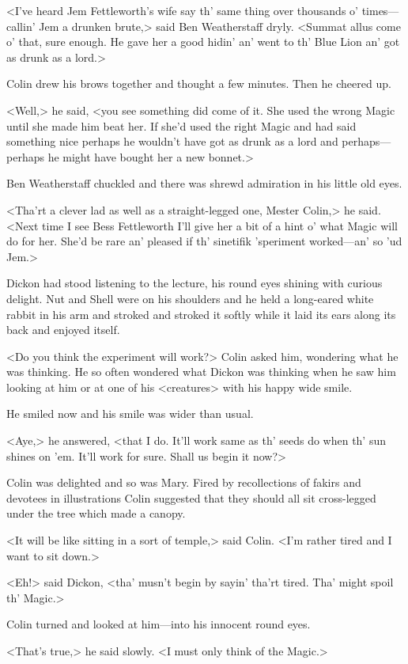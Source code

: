 <I've heard Jem Fettleworth's wife say th' same thing over thousands o' times—callin' Jem a drunken brute,> said Ben Weatherstaff dryly. <Summat allus come o' that, sure enough. He gave her a good hidin' an' went to th' Blue Lion an' got as drunk as a lord.>

Colin drew his brows together and thought a few minutes. Then he cheered up.

<Well,> he said, <you see something did come of it. She used the wrong Magic until she made him beat her. If she'd used the right Magic and had said something nice perhaps he wouldn't have got as drunk as a lord and perhaps—perhaps he might have bought her a new bonnet.>

Ben Weatherstaff chuckled and there was shrewd admiration in his little old eyes.

<Tha'rt a clever lad as well as a straight-legged one, Mester Colin,> he said. <Next time I see Bess Fettleworth I'll give her a bit of a hint o' what Magic will do for her. She'd be rare an' pleased if th' sinetifik 'speriment worked—an' so 'ud Jem.>

Dickon had stood listening to the lecture, his round eyes shining with curious delight. Nut and Shell were on his shoulders and he held a long-eared white rabbit in his arm and stroked and stroked it softly while it laid its ears along its back and enjoyed itself.

<Do you think the experiment will work?> Colin asked him, wondering what he was thinking. He so often wondered what Dickon was thinking when he saw him looking at him or at one of his <creatures> with his happy wide smile.

He smiled now and his smile was wider than usual.

<Aye,> he answered, <that I do. It'll work same as th' seeds do when th' sun shines on 'em. It'll work for sure. Shall us begin it now?>

Colin was delighted and so was Mary. Fired by recollections of fakirs and devotees in illustrations Colin suggested that they should all sit cross-legged under the tree which made a canopy.

<It will be like sitting in a sort of temple,> said Colin. <I'm rather tired and I want to sit down.>

<Eh!> said Dickon, <tha' musn't begin by sayin' tha'rt tired. Tha' might spoil th' Magic.>

Colin turned and looked at him—into his innocent round eyes.

<That's true,> he said slowly. <I must only think of the Magic.>

